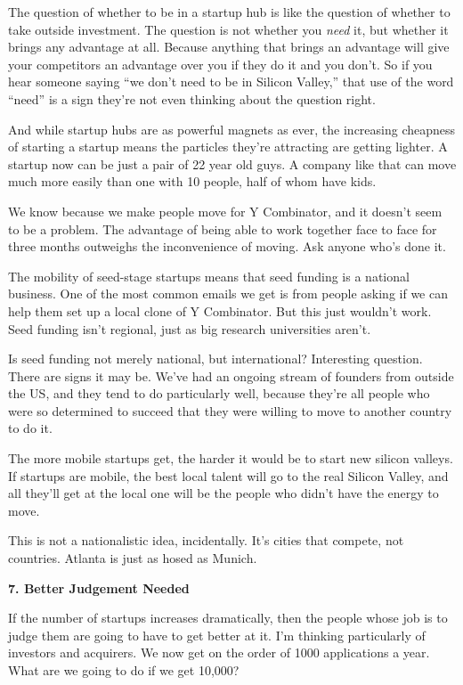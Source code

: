 \documentclass[12pt]{book}
\begin{document}
The question of whether to be in a startup hub is like the question of
whether to take outside investment. The question is not whether you
\emph{need} it, but whether it brings any advantage at all. Because
anything that brings an advantage will give your competitors an
advantage over you if they do it and you don't. So if you hear someone
saying ``we don't need to be in Silicon Valley,'' that use of the word
``need'' is a sign they're not even thinking about the question right.

And while startup hubs are as powerful magnets as ever, the increasing
cheapness of starting a startup means the particles they're attracting
are getting lighter. A startup now can be just a pair of 22 year old
guys. A company like that can move much more easily than one with 10
people, half of whom have kids.

We know because we make people move for Y Combinator, and it doesn't
seem to be a problem. The advantage of being able to work together face
to face for three months outweighs the inconvenience of moving. Ask
anyone who's done it.

The mobility of seed-stage startups means that seed funding is a
national business. One of the most common emails we get is from people
asking if we can help them set up a local clone of Y Combinator. But
this just wouldn't work. Seed funding isn't regional, just as big
research universities aren't.

Is seed funding not merely national, but international? Interesting
question. There are signs it may be. We've had an ongoing stream of
founders from outside the US, and they tend to do particularly well,
because they're all people who were so determined to succeed that they
were willing to move to another country to do it.

The more mobile startups get, the harder it would be to start new
silicon valleys. If startups are mobile, the best local talent will go
to the real Silicon Valley, and all they'll get at the local one will be
the people who didn't have the energy to move.

This is not a nationalistic idea, incidentally. It's cities that
compete, not countries. Atlanta is just as hosed as Munich.

\textbf{7. Better Judgement Needed}

If the number of startups increases dramatically, then the people whose
job is to judge them are going to have to get better at it. I'm thinking
particularly of investors and acquirers. We now get on the order of 1000
applications a year. What are we going to do if we get 10,000?
\end{document}
